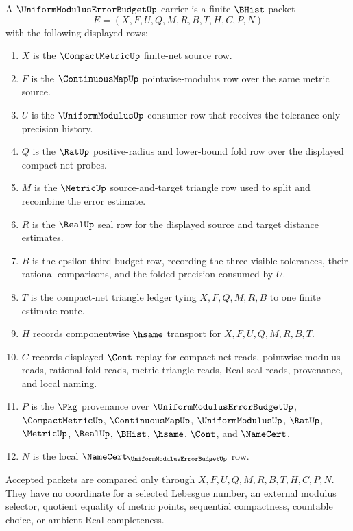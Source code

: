 \begin{definition}
\label{def:uniform-modulus-error-budget-carrier}
A $\UniformModulusErrorBudgetUp$ carrier is a finite $\BHist$ packet
$$
E=(X,F,U,Q,M,R,B,T,H,C,P,N)
$$
with the following displayed rows:
\begin{enumerate}
\item $X$ is the $\CompactMetricUp$ finite-net source row.
\item $F$ is the $\ContinuousMapUp$ pointwise-modulus row over the same metric source.
\item $U$ is the $\UniformModulusUp$ consumer row that receives the tolerance-only precision history.
\item $Q$ is the $\RatUp$ positive-radius and lower-bound fold row over the displayed compact-net probes.
\item $M$ is the $\MetricUp$ source-and-target triangle row used to split and recombine the error estimate.
\item $R$ is the $\RealUp$ seal row for the displayed source and target distance estimates.
\item $B$ is the epsilon-third budget row, recording the three visible tolerances, their rational comparisons, and the folded precision consumed by $U$.
\item $T$ is the compact-net triangle ledger tying $X,F,Q,M,R,B$ to one finite estimate route.
\item $H$ records componentwise $\hsame$ transport for $X,F,U,Q,M,R,B,T$.
\item $C$ records displayed $\Cont$ replay for compact-net reads, pointwise-modulus reads, rational-fold reads, metric-triangle reads, Real-seal reads, provenance, and local naming.
\item $P$ is the $\Pkg$ provenance over $\UniformModulusErrorBudgetUp$, $\CompactMetricUp$, $\ContinuousMapUp$, $\UniformModulusUp$, $\RatUp$, $\MetricUp$, $\RealUp$, $\BHist$, $\hsame$, $\Cont$, and $\NameCert$.
\item $N$ is the local $\NameCert_{\UniformModulusErrorBudgetUp}$ row.
\end{enumerate}
Accepted packets are compared only through $X,F,U,Q,M,R,B,T,H,C,P,N$. They have no coordinate for a selected Lebesgue number, an external modulus selector, quotient equality of metric points, sequential compactness, countable choice, or ambient Real completeness.
\end{definition}

